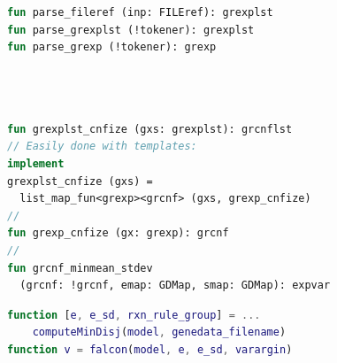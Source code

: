 \documentclass[compress]{beamer}
\begin{document}
\begin{frame}[fragile]
\begin{columns}
\begin{column}{0.55\textwidth}
{\color{gray!65}

{
\begin{lstlisting}[basicstyle=\ttfamily\tiny, language=ATS, showstringspaces=false]


fun parse_fileref (inp: FILEref): grexplst
fun parse_grexplst (!tokener): grexplst
fun parse_grexp (!tokener): grexp


\end{lstlisting}}

{
\begin{lstlisting}[basicstyle=\ttfamily\tiny, language=ATS, showstringspaces=false]



fun grexplst_cnfize (gxs: grexplst): grcnflst
// Easily done with templates:
implement
grexplst_cnfize (gxs) =
  list_map_fun<grexp><grcnf> (gxs, grexp_cnfize)
//
fun grexp_cnfize (gx: grexp): grcnf
//
fun grcnf_minmean_stdev
  (grcnf: !grcnf, emap: GDMap, smap: GDMap): expvar
\end{lstlisting}}

\vspace{4ex}

{
\begin{lstlisting}[basicstyle=\ttfamily\tiny, language=MATLAB, showstringspaces=false]
function [e, e_sd, rxn_rule_group] = ...
    computeMinDisj(model, genedata_filename)
function v = falcon(model, e, e_sd, varargin)
\end{lstlisting}}

} %
\end{column}

\end{columns}

\end{frame}
\end{document}
